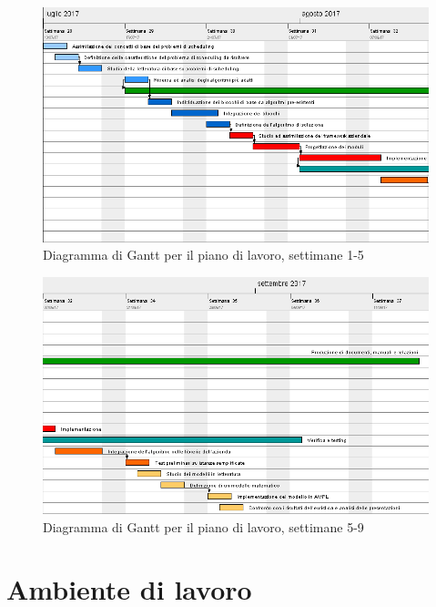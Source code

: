 \begin{figure}[!h]
    \label{fig21}
    \begin{widepage}
    \includegraphics[width=14.9cm,keepaspectratio]{../immagini/pdp_1.png}
    \caption{Diagramma di Gantt per il piano di lavoro, settimane 1-5}
    \end{widepage}
\end{figure}
\begin{figure}[!h]
    \label{fig22}
    \begin{widepage}
    \includegraphics[width=14.9cm,keepaspectratio]{../immagini/pdp_2.png}
    \caption{Diagramma di Gantt per il piano di lavoro, settimane 5-9}
    \end{widepage}
\end{figure}

\clearpage
\section{Ambiente di lavoro}
\label{duecinque}
